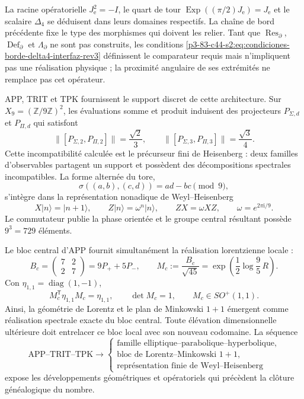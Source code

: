\begin{remark}
La racine opératorielle \(J_{\mathrm e}^2=-I\), le quart de tour
\(\operatorname{Exp}((\pi/2)J_{\mathrm e})=J_{\mathrm e}\) et le scalaire
\(\Delta_4\) se déduisent dans leurs domaines respectifs. La chaîne de bord
précédente fixe le type des morphismes qui doivent les relier. Tant que
\(\operatorname{Res}_{\partial}\), \(\operatorname{Def}_{\partial}\) et
\(\Lambda_{\partial}\) ne sont pas construits, les conditions
\eqref{p3-83-c44-s2:eq:condiciones-borde-delta4-interfaz-rev3} définissent le comparateur
requis mais n'impliquent pas une réalisation physique ; la proximité angulaire de
ses extrémités ne remplace pas cet opérateur.
\end{remark}

APP, TRIT et TPK fournissent le support discret de cette architecture. Sur
\(X_9=(\mathbb Z/9\mathbb Z)^2\), les évaluations somme et produit induisent des
projecteurs \(P_{\Sigma,d}\) et \(P_{\Pi,d}\) qui satisfont
\[
 \|[P_{\Sigma,2},P_{\Pi,2}]\|=\frac{\sqrt2}{3},
 \qquad
 \|[P_{\Sigma,3},P_{\Pi,3}]\|=\frac{\sqrt3}{4}.
\]
Cette incompatibilité calculée est le précurseur fini de Heisenberg : deux
familles d'observables partagent un support et possèdent des décompositions
spectrales incompatibles. La forme alternée du tore,
\[
 \sigma((a,b),(c,d))=ad-bc\pmod9,
\]
s'intègre dans la représentation nonadique de Weyl--Heisenberg
\[
 X|n\rangle=|n+1\rangle,\qquad
 Z|n\rangle=\omega^n|n\rangle,\qquad
 ZX=\omega XZ,
 \qquad \omega=e^{2\pi\mathrm i/9}.
\]
Le commutateur publie la phase orientée et le groupe central résultant possède
\(9^3=729\) éléments.

Le bloc central d'APP fournit simultanément la réalisation
lorentzienne locale :
\[
 B_c=
 \begin{pmatrix}7&2\\2&7\end{pmatrix}
 =9P_++5P_-,
 \qquad
 M_c:=\frac{B_c}{\sqrt{45}}
 =\exp\!\left(\frac12\log\frac95\,R\right).
\]
Con \(\eta_{1,1}=\operatorname{diag}(1,-1)\),
\[
 M_c^{\mathsf T}\eta_{1,1}M_c=\eta_{1,1},
 \qquad
 \det M_c=1,
 \qquad
 M_c\in SO^+(1,1).
\]
Ainsi, la géométrie de Lorentz et le plan de Minkowski \(1+1\) émergent comme
réalisation spectrale exacte du bloc central. Toute élévation dimensionnelle
ultérieure doit entrelacer ce bloc local avec son nouveau codomaine. La séquence
\[
 \boxed{
 \text{APP--TRIT--TPK}
 \longrightarrow
 \begin{cases}
 \text{famille elliptique--parabolique--hyperbolique},\\
 \text{bloc de Lorentz--Minkowski }1+1,\\
 \text{représentation finie de Weyl--Heisenberg}
 \end{cases}}
\]
expose les développements géométriques et opératoriels qui précèdent la clôture
généalogique du nombre.

